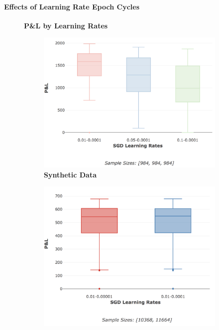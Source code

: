 \documentclass[a4paper,11pt,oneside]{article}
\theoremstyle{plain}
\theoremstyle{definition}
\begin{document}
		\paragraph{Effects of Learning Rate Epoch Cycles}
	
		\begin{figure}[H]
		\centering
		\textbf{P\&L by Learning Rates}
		\begin{subfigure}{.5\textwidth}
			\centering 
			\includegraphics[scale=0.3]{images/results/network/lr/synth_pl_minmax_lr.png}
			\caption{\textbf{Synthetic Data} 
				\newline }
			\label{figure-synth_pl_minmax_lr}
		\end{subfigure}%
		\begin{subfigure}{.5\textwidth}
			\centering 
			\includegraphics[scale=0.3]{images/results/network/lr/actual_pl_minmax_lr.png}

\end{subfigure}
\end{figure}
\end{document}
